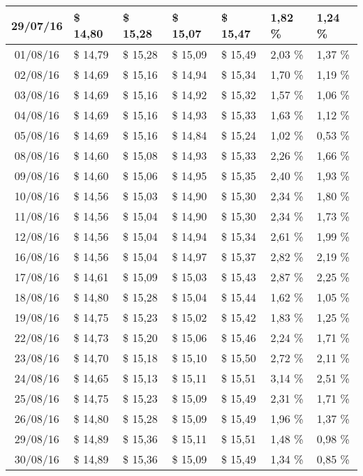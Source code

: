 \begin{center}
\begin{longtable}{|c|p{1.5cm}|p{1.5cm}|p{1.5cm}|p{1.5cm}|p{1.5cm}|p{1.5cm}|}
29/07/16 & \$ 14,80 & \$ 15,28 & \$ 15,07 & \$ 15,47 & 1,82 \% & 1,24 \% \\ \hline
01/08/16 & \$ 14,79 & \$ 15,28 & \$ 15,09 & \$ 15,49 & 2,03 \% & 1,37 \% \\ \hline
02/08/16 & \$ 14,69 & \$ 15,16 & \$ 14,94 & \$ 15,34 & 1,70 \% & 1,19 \% \\ \hline
03/08/16 & \$ 14,69 & \$ 15,16 & \$ 14,92 & \$ 15,32 & 1,57 \% & 1,06 \% \\ \hline
04/08/16 & \$ 14,69 & \$ 15,16 & \$ 14,93 & \$ 15,33 & 1,63 \% & 1,12 \% \\ \hline
05/08/16 & \$ 14,69 & \$ 15,16 & \$ 14,84 & \$ 15,24 & 1,02 \% & 0,53 \% \\ \hline
08/08/16 & \$ 14,60 & \$ 15,08 & \$ 14,93 & \$ 15,33 & 2,26 \% & 1,66 \% \\ \hline
09/08/16 & \$ 14,60 & \$ 15,06 & \$ 14,95 & \$ 15,35 & 2,40 \% & 1,93 \% \\ \hline
10/08/16 & \$ 14,56 & \$ 15,03 & \$ 14,90 & \$ 15,30 & 2,34 \% & 1,80 \% \\ \hline
11/08/16 & \$ 14,56 & \$ 15,04 & \$ 14,90 & \$ 15,30 & 2,34 \% & 1,73 \% \\ \hline
12/08/16 & \$ 14,56 & \$ 15,04 & \$ 14,94 & \$ 15,34 & 2,61 \% & 1,99 \% \\ \hline
16/08/16 & \$ 14,56 & \$ 15,04 & \$ 14,97 & \$ 15,37 & 2,82 \% & 2,19 \% \\ \hline
17/08/16 & \$ 14,61 & \$ 15,09 & \$ 15,03 & \$ 15,43 & 2,87 \% & 2,25 \% \\ \hline
18/08/16 & \$ 14,80 & \$ 15,28 & \$ 15,04 & \$ 15,44 & 1,62 \% & 1,05 \% \\ \hline
19/08/16 & \$ 14,75 & \$ 15,23 & \$ 15,02 & \$ 15,42 & 1,83 \% & 1,25 \% \\ \hline
22/08/16 & \$ 14,73 & \$ 15,20 & \$ 15,06 & \$ 15,46 & 2,24 \% & 1,71 \% \\ \hline
23/08/16 & \$ 14,70 & \$ 15,18 & \$ 15,10 & \$ 15,50 & 2,72 \% & 2,11 \% \\ \hline
24/08/16 & \$ 14,65 & \$ 15,13 & \$ 15,11 & \$ 15,51 & 3,14 \% & 2,51 \% \\ \hline
25/08/16 & \$ 14,75 & \$ 15,23 & \$ 15,09 & \$ 15,49 & 2,31 \% & 1,71 \% \\ \hline
26/08/16 & \$ 14,80 & \$ 15,28 & \$ 15,09 & \$ 15,49 & 1,96 \% & 1,37 \% \\ \hline
29/08/16 & \$ 14,89 & \$ 15,36 & \$ 15,11 & \$ 15,51 & 1,48 \% & 0,98 \% \\ \hline
30/08/16 & \$ 14,89 & \$ 15,36 & \$ 15,09 & \$ 15,49 & 1,34 \% & 0,85 \% \\ \hline

\end{longtable}
\end{center}
